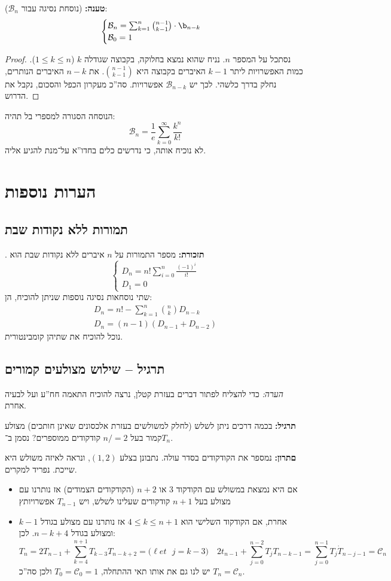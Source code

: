 \documentclass[]{article}
\newcommand\bc    {\mathcal{B}}
\newcommand\cc    {\mathcal{C}}
\newcommand\open  {\big(}
\newcommand\close {\big)}
\newcommand\set   {\ell et \text{ }}
\renewcommand\inf {\infty}
\newcommand\sumnko    {\sum_{k = 1}^{n}}
\newcommand\bink      {\binom{n}{k}}
\begin{document}
	\textbf{טענה: }(נוסחת נסיגה עבור $\bc_n$): 
	\[ \begin{cases}
		\bc_n = \sumnko \binom{n - 1}{k - 1} \cdot \b_{n - k} \\
		\bc_0 = 1
	\end{cases} \]
	
	\begin{proof}
		נסתכל על המספר $n$. נניח שהוא נמצא בחלוקה, בקבוצה שגודלה $k$ ($1 \le k \le n$). כמות האפשרויות ליתר $k - 1 $ האיברים בקבוצה היא $\binom{n - 1}{k - 1}$. את $n - k$ האיברים הנותרים, נחלק בדרך כלשהי. לכך יש $\bc_{n - k }$ אפשרויות. סה''כ מעקרון הכפל והסכום, נקבל את הדרוש. 
	\end{proof}
	הנוסחה הסגורה למספרי בל תהיה: 
	\[ \bc_n = \frac{1}{e} \sum_{k = 0}^{\inf} \frac{k^{n}}{k!} \]
	לא נוכיח אותה, כי נדרשים כלים בחדו''א על־מנת להגיע אליה. 
	\section{הערות נוספות}
	\subsection{תמורות ללא נקודות שבת}. 
	\textbf{תזכורת: }מספר התמורות על $n$ איברים ללא נקודות שבת הוא
	\[\begin{cases}
		D_n = n! \sum_{i = 0}^{n}\frac{(-1)^{i}}{i!} \\
		D_1 = 0
	\end{cases}\]
	שתי נוסחאות נסיגה נוספות שניתן להוכיח, הן: 
	\begin{gather}
		D_n = n! - \sumnko \bink D_{n - k} \\
		D_n = (n - 1) (D_{n - 1} + D_{n - 2})
	\end{gather}
	נוכל להוכיח את שתיהן קומבינטורית. 
	
	\subsection*{תרגיל – שילוש מצולעים קמורים}
	\textit{הערה: }כדי להצליח לפתור דברים בעזרת קטלן, נרצה להוכיח התאמה חח''ע ועל לבעיה אחרת. 
	
	\textbf{תרגיל: }בכמה דרכים ניתן לשלש (לחלק למשולשים בעזרת אלכסונים שאינן חותכים) מצולע קמור בעל $n /= 2$ קודקודים ממוספרים? נסמן ב־$T_n$. 
	
	\textbf{םתרון: }נמספר את הקודקודים בסדר עולה. נתבונן בצלע $(1, 2)$, ונראה לאיזה משולש היא שייכת. נפריד למקרים. 
	\begin{itemize}
		\item אם היא נמצאת במשולש עם הקודקוד $3$ או $n + 2$ (הקודקודים הצמודים) אז נותרנו עם מצולע בעל $n + 1$ קודקודים שעלינו לשלש, ויש $T_{n - 1}$ אפשרויותץ 
		\item אחרת, אם הקודקוד השלישי הוא $4 \le k \le n + 1$ אז נותרנו עם מצולע בגודל $k - 1$ ומצולע בגודל $n - k + 4$. לכן: 
		\[ T_n = 2T_{n - 1} + \sum_{k = 4}^{n + 1}T_{k - 3}T_{n - k + 2} = \open \set j = k - 3 \close \quad 2t_{n - 1} + \sum_{j = 0}^{n - 2} T_{j}T_{n - k - 1} = \sum_{j = 0}^{n - 1} T_j \dot T_{n - j - 1} = \cc_n \]
		יש לנו גם את אותו תאי ההתחלה, $T_0 = \cc_0 = 1 $ ולכן סה''כ $T_n = \cc_n$. 
	\end{itemize}
	
\end{document}
